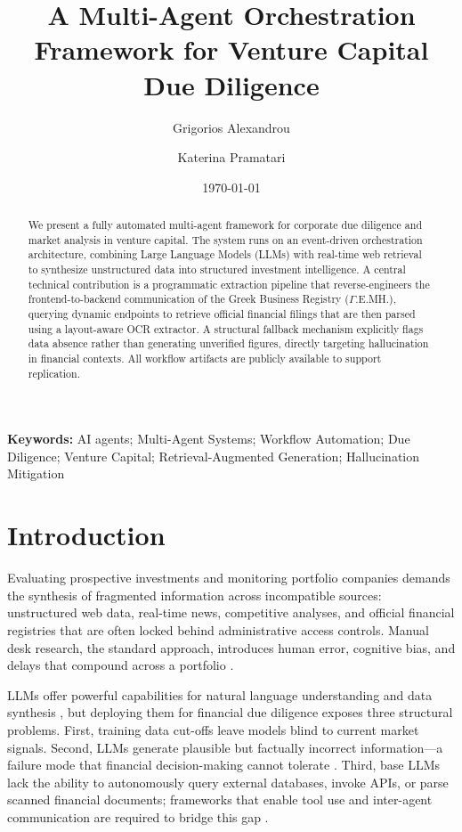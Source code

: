 \documentclass[12pt]{article}
\title{A Multi-Agent Orchestration Framework for Venture Capital Due Diligence}
\author{Grigorios Alexandrou}
\author{Katerina Pramatari}
\affil{Department of Management Science and Technology,
Athens University of Economics and Business (AUEB), Athens, Greece}
\date{\today}
\begin{document}
\maketitle

\begin{abstract}
  We present a fully automated multi-agent framework for corporate due diligence and market
  analysis in venture capital. The system runs on an event-driven orchestration architecture,
  combining Large Language Models (LLMs) with real-time web retrieval to synthesize unstructured
  data into structured investment intelligence. A central technical contribution is a programmatic
  extraction pipeline that reverse-engineers the frontend-to-backend communication of the Greek
  Business Registry ($\Gamma$.E.MH.), querying dynamic endpoints to retrieve official financial
  filings that are then parsed using a layout-aware OCR extractor. A structural fallback mechanism
  explicitly flags data absence rather than generating unverified figures, directly targeting
  hallucination in financial contexts. All workflow artifacts are publicly available to support
  replication.
\end{abstract}

\textbf{Keywords:} AI agents; Multi-Agent Systems; Workflow Automation; Due Diligence; Venture
Capital; Retrieval-Augmented Generation; Hallucination Mitigation

\section{Introduction}
\label{sec:intro}

Evaluating prospective investments and monitoring portfolio companies demands the synthesis of
fragmented information across incompatible sources: unstructured web data, real-time news,
competitive analyses, and official financial registries that are often locked behind
administrative access controls. Manual desk research, the standard approach, introduces human
error, cognitive bias, and delays that compound across a portfolio
\parencite{gompers2016private, kahneman2011thinking}.

LLMs offer powerful capabilities for natural language understanding and data synthesis
\parencite{bommasani2021opportunities}, but deploying them for financial due diligence exposes
three structural problems. First, training data cut-offs leave models blind to current market
signals. Second, LLMs generate plausible but factually incorrect information---a failure mode that
financial decision-making cannot tolerate \parencite{ji2023survey}. Third, base LLMs lack the
ability to autonomously query external databases, invoke APIs, or parse scanned financial
documents; frameworks that enable tool use and inter-agent communication are required to bridge
this gap \parencite{wu2023autogen}.
\end{document}
